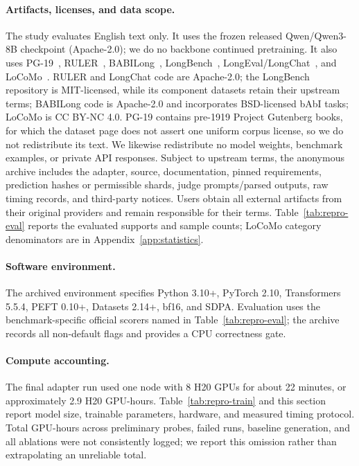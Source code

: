 \paragraph{Artifacts, licenses, and data scope.}
The study evaluates English text only. It uses the frozen released
Qwen/Qwen3-8B checkpoint (Apache-2.0); we do no backbone continued pretraining.
It also uses PG-19~\citep{pg19}, RULER~\citep{ruler}, BABILong~\citep{babilong},
LongBench~\citep{longbench}, LongEval/LongChat~\citep{longchat}, and
LoCoMo~\citep{locomo}. RULER and LongChat code are Apache-2.0; the LongBench
repository is MIT-licensed, while its component datasets retain their upstream
terms; BABILong code is Apache-2.0 and incorporates BSD-licensed bAbI tasks;
LoCoMo is CC BY-NC 4.0. PG-19 contains pre-1919 Project Gutenberg books, for
which the dataset page does not assert one uniform corpus license, so we do not
redistribute its text. We likewise redistribute no model weights, benchmark
examples, or private API responses. Subject to upstream terms, the anonymous
archive includes the adapter, source, documentation, pinned requirements,
prediction hashes or permissible shards, judge prompts/parsed outputs, raw
timing records, and third-party notices. Users obtain all external artifacts
from their original providers and remain
responsible for their terms. Table~\ref{tab:repro-eval} reports the evaluated
supports and sample counts; LoCoMo category denominators are in
Appendix~\ref{app:statistics}.

\paragraph{Software environment.}
The archived environment specifies Python 3.10+, PyTorch 2.10,
Transformers 5.5.4, PEFT 0.10+, Datasets 2.14+, bf16, and SDPA. Evaluation uses
the benchmark-specific official scorers named in Table~\ref{tab:repro-eval}; the
archive records all non-default flags and provides a CPU correctness gate.

\paragraph{Compute accounting.}
The final adapter run used one node with 8 H20 GPUs for about 22 minutes, or
approximately 2.9 H20 GPU-hours. Table~\ref{tab:repro-train} and this section
report model size, trainable parameters, hardware, and measured timing protocol.
Total GPU-hours across preliminary probes, failed runs, baseline generation, and
all ablations were not consistently logged; we report this omission rather than
extrapolating an unreliable total.

